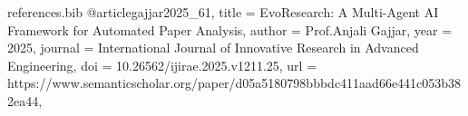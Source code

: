 \begin{filecontents*}{references.bib}
@article{gajjar2025_61,
  title = {EvoResearch: A Multi-Agent AI Framework for Automated Paper Analysis},
  author = {Prof.Anjali Gajjar},
  year = {2025},
  journal = {International Journal of Innovative Research in Advanced Engineering},
  doi = {10.26562/ijirae.2025.v1211.25},
  url = {https://www.semanticscholar.org/paper/d05a5180798bbbdc411aad66e441c053b382ea44},
}
\end{filecontents*}
